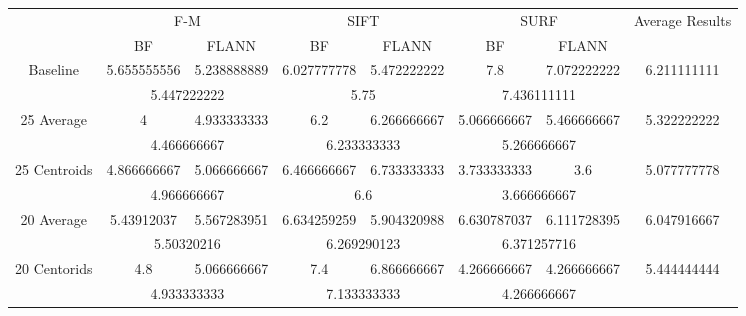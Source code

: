 \documentclass[draft,final]{vutinfth} %
\begin{document}
\begin{sidewaystable}
\centering
\begin{tabular}{cccccccc}
& \multicolumn{2}{c}{ F-M } & \multicolumn{2}{c}{ SIFT } & \multicolumn{2}{c}{ SURF } & \multirow{2}{*}{ Average Results } \\
& BF & FLANN & BF & FLANN & BF & FLANN & \\
Baseline & 5.655555556 & 5.238888889 & 6.027777778 & 5.472222222 & 7.8 & 7.072222222 & \multirow{2}{*}{ 6.211111111 } \\
& \multicolumn{2}{c}{ 5.447222222 } & \multicolumn{2}{c}{ 5.75 } & \multicolumn{2}{c}{ 7.436111111 } & \\
25 Average & 4 & 4.933333333 & 6.2 & 6.266666667 & 5.066666667 & 5.466666667 & \multirow{2}{*}{ 5.322222222 } \\
& \multicolumn{2}{c}{ 4.466666667 } & \multicolumn{2}{c}{ 6.233333333 } & \multicolumn{2}{c}{ 5.266666667 } & \\
25 Centroids & 4.866666667 & 5.066666667 & 6.466666667 & 6.733333333 & 3.733333333 & 3.6 & \multirow{2}{*}{ 5.077777778 } \\
& \multicolumn{2}{c}{ 4.966666667 } & \multicolumn{2}{c}{ 6.6 } & \multicolumn{2}{c}{ 3.666666667 } & \\
20 Average & 5.43912037 & 5.567283951 & 6.634259259 & 5.904320988 & 6.630787037 & 6.111728395 & \multirow{2}{*}{ 6.047916667 } \\
& \multicolumn{2}{c}{ 5.50320216 } & \multicolumn{2}{c}{ 6.269290123 } & \multicolumn{2}{c}{ 6.371257716 } & \\
20 Centorids & 4.8 & 5.066666667 & 7.4 & 6.866666667 & 4.266666667 & 4.266666667 & \multirow{2}{*}{ 5.444444444 } \\
& \multicolumn{2}{c}{ 4.933333333 } & \multicolumn{2}{c}{ 7.133333333 } & \multicolumn{2}{c}{ 4.266666667 } & \\
\end{tabular}
 \label{tab:ov} 
\end{sidewaystable}
\end{document}
